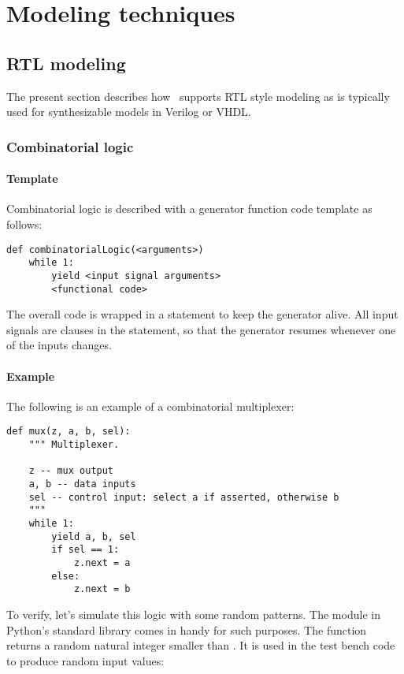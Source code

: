 \chapter{Modeling techniques}

\section{RTL modeling}

The present section describes how \myhdl\ supports RTL style modeling
as is typically used for synthesizable models in Verilog or VHDL.

\subsection{Combinatorial logic}

\subsubsection{Template}

Combinatorial logic is described with a generator function code template as
follows: 

\begin{verbatim}
def combinatorialLogic(<arguments>)
    while 1:
        yield <input signal arguments>
        <functional code>

\end{verbatim}

The overall code is wrapped in a  statement to keep the
generator alive. All input signals are clauses in the 
statement, so that the generator resumes whenever one of the inputs
changes. 

\subsubsection{Example}

The following is an example of a combinatorial multiplexer:

\begin{verbatim}
def mux(z, a, b, sel):
    """ Multiplexer.
    
    z -- mux output
    a, b -- data inputs
    sel -- control input: select a if asserted, otherwise b
    """
    while 1:
        yield a, b, sel
        if sel == 1:
            z.next = a
        else:
            z.next = b
\end{verbatim}

To verify, let's simulate this logic with some random patterns. The
 module in Python's standard library comes in handy for
such purposes. The function  returns a random
natural integer smaller than . It is used in the test bench
code to produce random input values:

